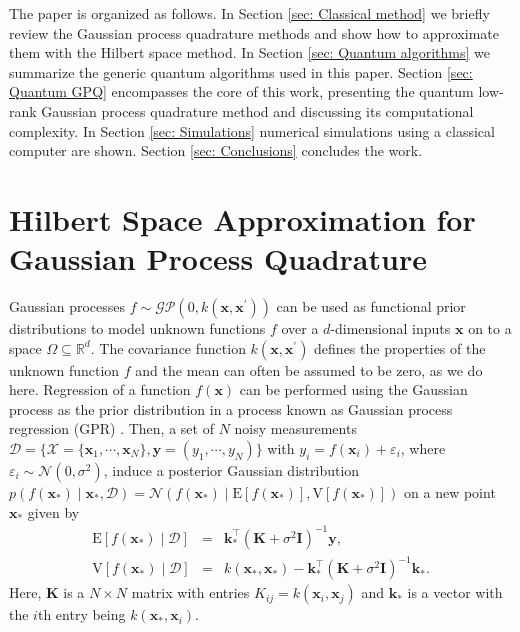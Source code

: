 \documentclass[10pt]{article}
\begin{document}
	The paper is organized as follows. In Section \ref{sec: Classical method} we briefly review the Gaussian process quadrature methods and show how to approximate them with the Hilbert space method. In Section \ref{sec: Quantum algorithms} we summarize the generic quantum algorithms used in this paper. Section \ref{sec: Quantum GPQ} encompasses the core of this work, presenting the quantum low-rank Gaussian process quadrature method and discussing its computational complexity. In Section \ref{sec: Simulations} numerical simulations using a classical computer are shown. Section \ref{sec: Conclusions} concludes the work.
	
	\section{\label{sec: Classical method}Hilbert Space Approximation for Gaussian Process Quadrature}
	
	Gaussian processes $f \sim \mathcal{GP}\left(0, k\left(\mathbf{x},\mathbf{x}^\prime\right)\right)$ can be used as functional prior distributions to model unknown functions $f$ over a $d$-dimensional inputs $\mathbf{x}$ on to a space $\Omega \subseteq \mathbb{R}^d$. The covariance function $k\left(\mathbf{x},\mathbf{x}^\prime\right)$ defines the properties of the unknown function $f$ and the mean can often be assumed to be zero, as we do here. Regression of a function $f(\mathbf{x})$ can be performed using the Gaussian process as the prior distribution in a process known as Gaussian process regression (GPR) \citep{Rasmussen2006GPforML}. 
	Then, a set of $N$ noisy measurements $\mathcal{D} = \{\mathcal{X} = \{\mathbf{x}_1,\cdots,\mathbf{x}_N\}, \mathbf{y} = (y_1,\cdots,y_N)\}$ with $y_i = f(\mathbf{x}_i) + \varepsilon_i$, where  $\varepsilon_i \sim \mathcal{N}\left(0,\sigma^2\right)$, induce a posterior Gaussian distribution $ p\left(f(\mathbf{x}_*) \mid \mathbf{x}_{*},\mathcal{D}\right) =  \mathcal{N}\left(f(\mathbf{x}_*)\mid\mathrm{E}[{f}(\mathbf{x}_*)], \mathrm{V}\left[{f}(\mathbf{x}_*)\right]\right)$ on a new point $\mathbf{x}_*$ given by 
	\begin{eqnarray}
		\mathrm{E}[{f}(\mathbf{x}_*)\mid \mathcal{D}] &=& \mathbf{k}_*^{\top}\left(\mathbf{K}+\sigma^2 \mathbf{I}\right)^{-1} \mathbf{y},\label{eq: Classic GPR} \\
		\mathrm{V}\left[{f}(\mathbf{x}_*)\mid \mathcal{D} \right] &=& k\left(\mathbf{x}_{*}, \mathbf{x}_{*}\right)-\mathbf{k}_*^{\top}\left(\mathbf{K}+\sigma^2 \mathbf{I}\right)^{-1} \mathbf{k}_* .\label{eq: Classic GPR var}
	\end{eqnarray}
	Here, $\mathbf{K}$ is a $N\times N$ matrix with entries $K_{ij} = k(\mathbf{x}_i, \mathbf{x}_j)$ and $\mathbf{k}_*$ is a vector with the $i$th entry being $k(\mathbf{x}_*, \mathbf{x}_i)$. 
	
\end{document}
